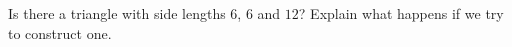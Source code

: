 Is there a triangle with side lengths $6$, $6$ and $12$? Explain what happens if we try to construct one.
